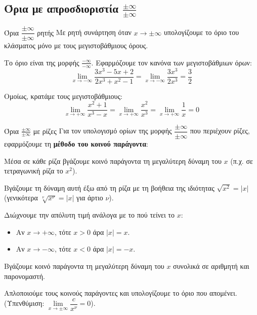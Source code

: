 \subsection{Όρια με απροσδιοριστία $ \frac{\pm\infty}{\pm\infty} $}
\begin{askhsh}{Όρια $ \dfrac{\pm\infty}{\pm\infty} $ ρητής}
Με ρητή συνάρτηση όταν $ x\to\pm\infty $ υπολογίζουμε το όριο του κλάσματος μόνο με τους μεγιστοβάθμιους όρους.
\end{askhsh}
\lysh
\begin{alist}
\item Το όριο είναι της μορφής $\frac{-\infty}{-\infty}$. Εφαρμόζουμε τον κανόνα των μεγιστοβάθμιων όρων:
\[
\lim\limits_{x\to -\infty} \dfrac{3x^3 - 5x + 2}{2x^3 + x^2 - 1} = \lim\limits_{x\to -\infty} \dfrac{3x^3}{2x^3} = \dfrac{3}{2}
\]
\item Ομοίως, κρατάμε τους μεγιστοβάθμιους:
\[
\lim\limits_{x\to +\infty} \dfrac{x^2 + 1}{x^3 - x}=\lim\limits_{x\to +\infty} \dfrac{x^2}{x^3} = \lim\limits_{x\to +\infty} \dfrac{1}{x} = 0
\]
\end{alist}
\begin{askhsh}{Όρια $ \frac{\pm\infty}{\pm\infty} $ με ρίζες}
Για τον υπολογισμό ορίων της μορφής $\dfrac{\pm\infty}{\pm\infty}$ που περιέχουν ρίζες, εφαρμόζουμε τη \textbf{μέθοδο του κοινού παράγοντα}:
\bhmata\begin{bhma}
\item Μέσα σε κάθε ρίζα βγάζουμε κοινό παράγοντα τη μεγαλύτερη δύναμη του $x$ (π.χ. σε τετραγωνική ρίζα το $x^2$).
\item Βγάζουμε τη δύναμη αυτή έξω από τη ρίζα με τη βοήθεια της ιδιότητας $\sqrt{x^2} = |x|$ (γενικότερα $\sqrt[\nu]{x^\nu} = |x|$ για άρτιο $\nu$).
\item Διώχνουμε την απόλυτη τιμή ανάλογα με το πού τείνει το $x$:
\begin{itemize}
    \item Αν $x \to +\infty$, τότε $x > 0$ άρα $|x| = x$.
    \item Αν $x \to -\infty$, τότε $x < 0$ άρα $|x| = -x$.
\end{itemize}
\item Βγάζουμε κοινό παράγοντα τη μεγαλύτερη δύναμη του $x$ συνολικά σε αριθμητή και παρονομαστή.
\item Απλοποιούμε τους κοινούς παράγοντες και υπολογίζουμε το όριο που απομένει. (Υπενθύμιση: $\lim\limits_{x\to \pm\infty}\dfrac{c}{x^\nu} = 0$).
\end{bhma}
\end{askhsh}

